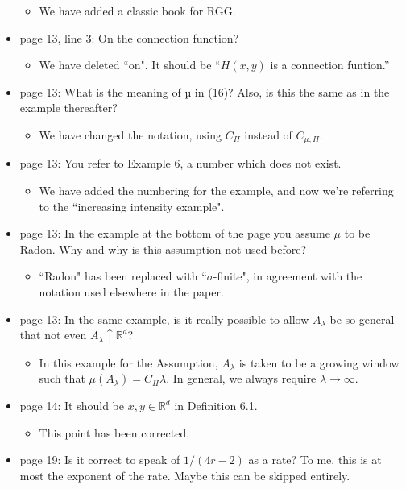 \documentclass[11pt]{article}
\def\real{{\mathord{{\rm I\kern-2.8pt R}}}}        %
\def\real{{\mathord{\mathbb R}}}
\begin{document}
\begin{itemize}
  \begin{itemize}
    \item We have added a classic book for RGG.
  \end{itemize}
  \item  page 13, line 3: On the connection function?
  \begin{itemize}
    \item We have deleted  ``on". It should be ``$H(x,y)$ is a connection funtion.'' 
  \end{itemize}
  \item  page 13: What is the meaning of µ in (16)? Also, is this the same as in the example thereafter?
  \begin{itemize}
    \item We have changed the notation, using $C_H$ instead of $C_{\mu, H}$.
  \end{itemize}
  \item  page 13: You refer to Example 6, a number which does not exist.
  \begin{itemize}
    \item We have added the numbering for the example, and now we're referring to the ``increasing intensity example".
  \end{itemize}
  \item  page 13: In the example at the bottom of the page you assume $\mu$ to be Radon. Why and why is this assumption not used before?
  \begin{itemize}
  \item ``Radon" has been replaced with ``$\sigma$-finite", in agreement with the notation used elsewhere in the paper. 
  \end{itemize}
  \item  page 13: In the same example, is it really possible to allow
    $A_\lambda$ be so general that not even $A_\lambda \uparrow \real^d$?
    \begin{itemize}
    \item In this example for the Assumption, $A_\lambda$ is taken to be a growing window such that $\mu(A_\lambda)=C_H \lambda$. In general, we always require $\lambda\to\infty$.
    \end{itemize}
  \item  page 14: It should be $x, y \in \real^d$ in Definition 6.1.
  \begin{itemize}
  \item This point has been corrected.
  \end{itemize}
  \item  page 19: Is it correct to speak of $1/(4r - 2)$ as a rate? To me, this is at most the exponent of the rate. Maybe this can be skipped entirely.

\end{itemize}
\end{document}
